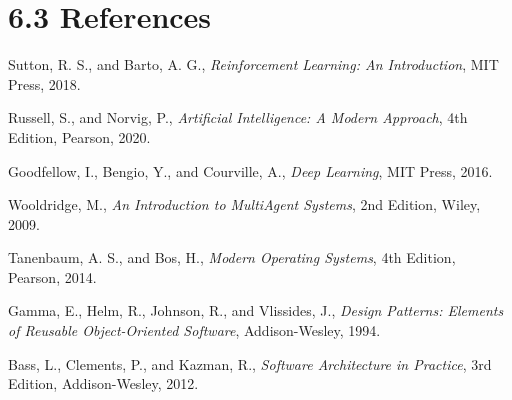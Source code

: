 \clearpage
\section{6.3 References}
\label{sec:references}



\vspace{0.3cm}

\noindent [1] Sutton, R. S., and Barto, A. G., \textit{Reinforcement Learning: An Introduction}, MIT Press, 2018.

\vspace{0.2cm}

\noindent [2] Russell, S., and Norvig, P., \textit{Artificial Intelligence: A Modern Approach}, 4th Edition, Pearson, 2020.

\vspace{0.2cm}

\noindent [3] Goodfellow, I., Bengio, Y., and Courville, A., \textit{Deep Learning}, MIT Press, 2016.

\vspace{0.2cm}

\noindent [4] Wooldridge, M., \textit{An Introduction to MultiAgent Systems}, 2nd Edition, Wiley, 2009.


\vspace{0.3cm}

\noindent [5] Tanenbaum, A. S., and Bos, H., \textit{Modern Operating Systems}, 4th Edition, Pearson, 2014.

\vspace{0.2cm}

\noindent [6] Gamma, E., Helm, R., Johnson, R., and Vlissides, J., \textit{Design Patterns: Elements of Reusable Object-Oriented Software}, Addison-Wesley, 1994.

\vspace{0.2cm}

\noindent [7] Bass, L., Clements, P., and Kazman, R., \textit{Software Architecture in Practice}, 3rd Edition, Addison-Wesley, 2012.

